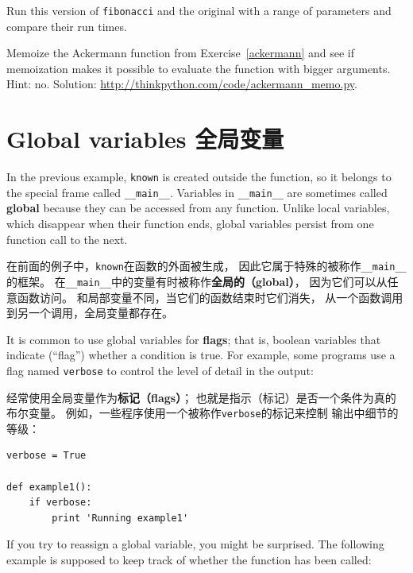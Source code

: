 \documentclass[10pt]{book}
\begin{document}
\begin{CJK}{UTF8}{gbsn}
\begin{exercise}

Run this version of {\tt fibonacci} and the original with
a range of parameters and compare their run times.

\end{exercise}

\begin{exercise}

Memoize the Ackermann function from Exercise~\ref{ackermann} and see if
memoization makes it possible to evaluate the function with bigger
arguments.  Hint: no.
Solution: \url{http://thinkpython.com/code/ackermann_memo.py}.

\end{exercise}


\section{Global variables 全局变量}

In the previous example, {\tt known} is created outside the function,
so it belongs to the special frame called \verb"__main__".
Variables in \verb"__main__" are sometimes called {\bf global}
because they can be accessed from any function.  Unlike local
variables, which disappear when their function ends, global variables
persist from one function call to the next.

在前面的例子中，{\tt known}在函数的外面被生成，
因此它属于特殊的被称作\verb"__main__"的框架。
在\verb"__main__"中的变量有时被称作{\bf 全局的（global）}，
因为它们可以从任意函数访问。
和局部变量不同，当它们的函数结束时它们消失，
从一个函数调用到另一个调用，全局变量都存在。

It is common to use global variables for {\bf flags}; that is, 
boolean variables that indicate (``flag'') whether a condition
is true.  For example, some programs use
a flag named {\tt verbose} to control the level of detail in the
output:

经常使用全局变量作为{\bf 标记（flags）}；
也就是指示（标记）是否一个条件为真的布尔变量。
例如，一些程序使用一个被称作{\tt verbose}的标记来控制
输出中细节的等级：

\begin{verbatim}
verbose = True

def example1():
    if verbose:
        print 'Running example1'
\end{verbatim}
%
If you try to reassign a global variable, you might be surprised.
The following example is supposed to keep track of whether the
function has been called:


\end{CJK}
\end{document}
